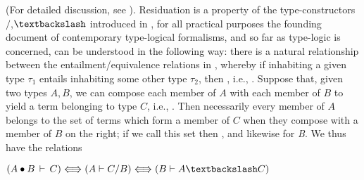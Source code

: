 \documentclass[output=paper,colorlinks,citecolor=brown]{langscibook}
\begin{document}
\begin{exe}
 \ex\label{residuation}
  \sem{ (\psi  \ensuremath{\vdash\xspace } \psi\supset\varrho)\Lleftarrow\!\Rrightarrow (\psi,\phi  \ensuremath{\vdash\xspace } \varrho)\Lleftarrow\!\Rrightarrow (\phi  \ensuremath{\vdash\xspace } \psi\supset\varrho) }
\end{exe}
(For detailed discussion, see \citealt{sep-logic-substructural}). Residuation
is a property of the type-constructors $/$,$\bsl$ introduced in
\citet{lambek58}, for all practical purposes the founding document of
contemporary type-logical formalisms, and so far as type-logic is
concerned, can be understood in the following way: there is a natural
relationship between the entailment/equivalence relations in
, whereby if inhabiting a given type $\tau_1$ entails
inhabiting some other type $\tau_2$, then \sem{ \tau_1  \ensuremath{\vdash\xspace } \tau_2 },
i.e., \sem{   \ensuremath{\vdash\xspace } \tau_1 \ensuremath{ \rightarrow } \tau_2 }. Suppose that, given two types $A,B$,
we can compose each member of $A$ with each member of $B$ to yield a
term belonging to type $C$, i.e., \sem{ A\bullet B\,  \ensuremath{\vdash\xspace } \,\textit{C}  }. Then
necessarily every member of $A$ belongs to the set of terms which form
a member of $C$ when they compose with a member of $B$ on the right;
if we call this set  then
\sem{ A{}  \ensuremath{\vdash\xspace } C/B}, and likewise for
\textit{B}. We thus have the relations

\begin{exe}
 \ex\label{typeResiduation}
   $ (A \bullet B\,\vdash\, C) \Lleftarrow\!\Rrightarrow (A \vdash C/B)
   \Lleftarrow\!\Rrightarrow (B \vdash A\bsl C)$
\end{exe}

\end{document}
